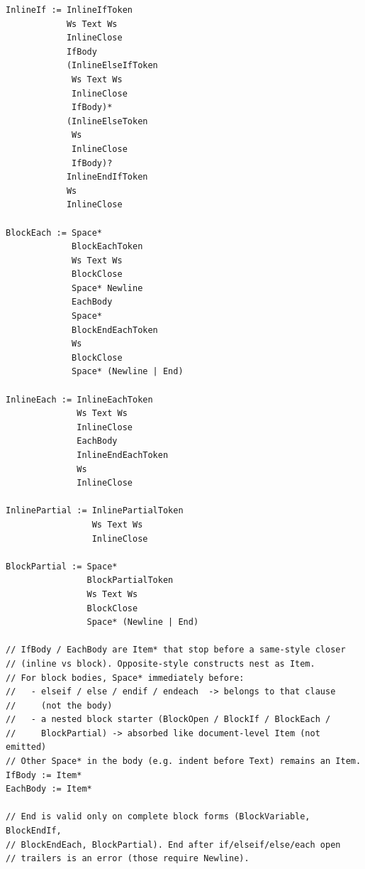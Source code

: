 \documentclass[11pt,letterpaper]{article}
\begin{document}
\begin{lstlisting}[style=bnf]
InlineIf := InlineIfToken
            Ws Text Ws
            InlineClose
            IfBody
            (InlineElseIfToken
             Ws Text Ws
             InlineClose
             IfBody)*
            (InlineElseToken
             Ws
             InlineClose
             IfBody)?
            InlineEndIfToken
            Ws
            InlineClose

BlockEach := Space*
             BlockEachToken
             Ws Text Ws
             BlockClose
             Space* Newline
             EachBody
             Space*
             BlockEndEachToken
             Ws
             BlockClose
             Space* (Newline | End)

InlineEach := InlineEachToken
              Ws Text Ws
              InlineClose
              EachBody
              InlineEndEachToken
              Ws
              InlineClose

InlinePartial := InlinePartialToken
                 Ws Text Ws
                 InlineClose

BlockPartial := Space*
                BlockPartialToken
                Ws Text Ws
                BlockClose
                Space* (Newline | End)

// IfBody / EachBody are Item* that stop before a same-style closer
// (inline vs block). Opposite-style constructs nest as Item.
// For block bodies, Space* immediately before:
//   - elseif / else / endif / endeach  -> belongs to that clause
//     (not the body)
//   - a nested block starter (BlockOpen / BlockIf / BlockEach /
//     BlockPartial) -> absorbed like document-level Item (not emitted)
// Other Space* in the body (e.g. indent before Text) remains an Item.
IfBody := Item*
EachBody := Item*

// End is valid only on complete block forms (BlockVariable, BlockEndIf,
// BlockEndEach, BlockPartial). End after if/elseif/else/each open
// trailers is an error (those require Newline).
\end{lstlisting}
\end{document}
